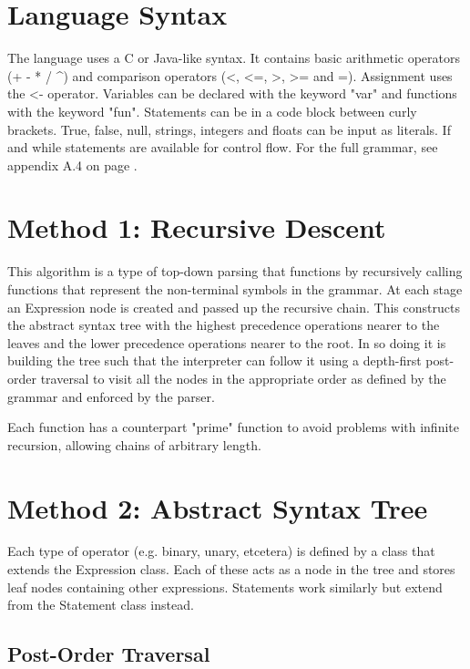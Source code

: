 \documentclass[a4paper, oneside, 11pt]{report}
\begin{document}
\section{Language Syntax}
The language uses a C or Java-like syntax. It contains basic arithmetic operators (+ - * / \textasciicircum) and comparison operators (\textless, \textless=, \textgreater, \textgreater= and =). Assignment uses the \textless- operator.
Variables can be declared with the keyword "var" and functions with the keyword "fun". Statements can be in a code block between curly brackets. True, false, null, strings, integers and floats can be input as literals. If and while statements are 
available for control flow.
For the full grammar, see appendix A.4 on page \pageref{bnf:grammar}.


\section{Method 1: Recursive Descent}

This algorithm is a type of top-down parsing that functions by recursively calling functions that represent the non-terminal symbols in the grammar.
At each stage an Expression node is created and passed up the recursive chain. This constructs the abstract syntax tree with the highest precedence
operations nearer to the leaves and the lower precedence operations nearer to the root. In so doing it is building the tree such that the interpreter 
can follow it using a depth-first post-order traversal to visit all the nodes in the appropriate order as defined by the grammar and enforced by the parser.

Each function has a counterpart "prime" function to avoid problems with infinite recursion, allowing chains of arbitrary length.

\section{Method 2: Abstract Syntax Tree}

Each type of operator (e.g. binary, unary, etcetera) is defined by a class that extends the Expression class.
Each of these acts as a node in the tree and stores leaf nodes containing other expressions.
Statements work similarly but extend from the Statement class instead.

\subsection{Post-Order Traversal}
\end{document}
